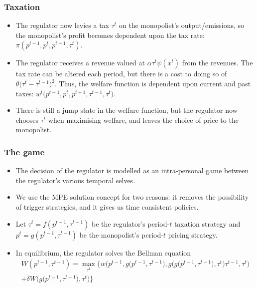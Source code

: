 \documentclass{beamer}
\begin{document}
\begin{frame}
  \frametitle{Taxation}
  \begin{itemize}
  \item<1-> The regulator now levies a tax $\tau^t$ on the
    monopolist's output/emissions, so the monopolist's profit becomes
    dependent upon the tax rate: $\pi (p^{t-1}, p^t, p^{t+1}, \tau^t)$.
  \item<2-> The regulator receives a revenue valued at $\alpha\tau^t
    \psi(x^t)$ from the revenues. The tax rate can be altered each
    period, but there is a cost to doing so of
    $\theta\big(\tau^t-\tau^{t-1}\big)^2$. Thus, the welfare function
    is dependent upon current and past taxes:
    $w^t\big(p^{t-1},p^t,p^{t+1},\tau^{t-1},\tau^t\big)$.
  \item<3-> There is still a jump state in the welfare function, but
    the regulator now chooses $\tau^t$ when maximising welfare, and
    leaves the choice of price to the monopolist.
  \end{itemize}
\end{frame}

\begin{frame}
  \frametitle{The game}
  \begin{itemize}
  \item<1-> The decision of the regulator is modelled as an
    intra-personal game between the regulator's various temporal selves.
  \item<2-> We use the MPE solution concept for two reasons: it
    removes the possibility of trigger strategies, and it gives us
    time consistent policies.
  \end{itemize}
\end{frame}

\begin{frame}
    \begin{itemize}
\item<1-> Let $\tau^t = f(p^{t-1}, \tau^{t-1})$ be the regulator's
    period-$t$ taxation strategy and $p^t = g(p^{t-1}, \tau^{t-1})$ be
    the monopolist's period-$t$ pricing strategy.
  \item<2-> In equilibrium, the regulator solves the Bellman equation
    \scriptsize{\begin{multline} 
      W(p^{t-1},\tau^{t-1}) = \max_{\tau^t} \Bigg\{ w \bigg( p^{t-1},
      g\big(p^{t-1},\tau^{t-1}\big), g \Big(
      g\big(p^{t-1},\tau^{t-1}\big) , \tau^t \Big) \tau^{t-1}, \tau^t
      \bigg) \\ + \delta W \Big( g\big(p^{t-1},\tau^{t-1}\big) ,
      \tau^t \Big) \Bigg\}
\end{multline}}
\end{itemize}
\end{frame}
\end{document}
